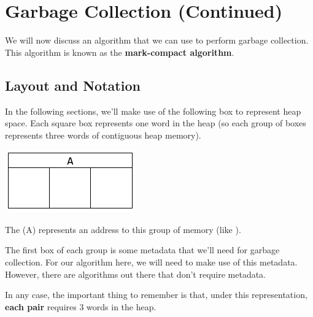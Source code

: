 \documentclass[letterpaper]{article}
\begin{document}
\section{Garbage Collection (Continued)}
We will now discuss an algorithm that we can use to perform garbage collection. This algorithm is known as the \textbf{mark-compact algorithm}.

\subsection{Layout and Notation}
In the following sections, we'll make use of the following box to represent heap space. Each square box represents one word in the heap (so each group of boxes represents three words of contiguous heap memory).
\begin{center}
    \includegraphics[scale=0.7]{../assets/GCAlgLayout.png}
\end{center}
The (A) represents an address to this group of memory (like ).

\bigskip 

The first box of each group is some metadata that we'll need for garbage collection. For our algorithm here, we will need to make use of this metadata. However, there are algorithms out there that don't require metadata.

\bigskip 

In any case, the important thing to remember is that, under this representation, \textbf{each pair} requires 3 words in the heap. 
\end{document}
